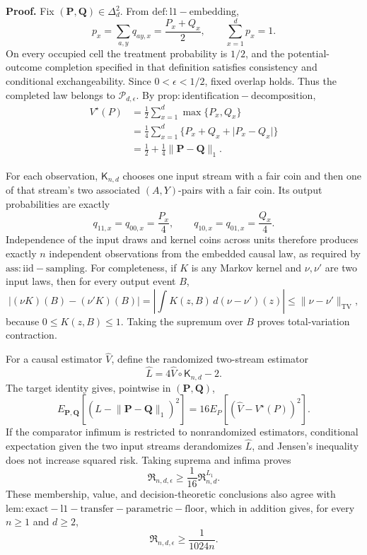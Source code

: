 \textbf{Proof.}
Fix \((\mathbf P,\mathbf Q)\in\Delta_d^2\).  From \(\mathrm{def:l1-embedding}\),
\[
 p_x=\sum_{a,y}q_{ay,x}=\frac{P_x+Q_x}{2},
 \qquad
 \sum_{x=1}^dp_x=1.
\]
On every occupied cell the treatment probability is \(1/2\), and the potential-outcome completion specified in that definition satisfies consistency and conditional exchangeability.  Since \(0<\epsilon<1/2\), fixed overlap holds.  Thus the completed law belongs to \(\mathcal P_{d,\epsilon}\).  By \(\mathrm{prop:identification-decomposition}\),
\[
 \begin{aligned}
 V^\star(P)
 &=\frac12\sum_{x=1}^d\max\{P_x,Q_x\}\\
 &=\frac14\sum_{x=1}^d
   \{P_x+Q_x+\lvert P_x-Q_x\rvert\}\\
 &=\frac12+\frac14\lVert\mathbf P-\mathbf Q\rVert_1.
 \end{aligned}
\]

For each observation, \(\mathsf K_{n,d}\) chooses one input stream with a fair coin and then one of that stream's two associated \((A,Y)\)-pairs with a fair coin.  Its output probabilities are exactly
\[
 q_{11,x}=q_{00,x}=\frac{P_x}{4},
 \qquad
 q_{10,x}=q_{01,x}=\frac{Q_x}{4}.
\]
Independence of the input draws and kernel coins across units therefore produces exactly \(n\) independent observations from the embedded causal law, as required by \(\mathrm{ass:iid-sampling}\).  For completeness, if \(K\) is any Markov kernel and \(\nu,\nu'\) are two input laws, then for every output event \(B\),
\[
 \lvert(\nu K)(B)-(\nu'K)(B)\rvert
 =\left\lvert\int K(z,B)\,d(\nu-\nu')(z)\right\rvert
 \le\lVert\nu-\nu'\rVert_{\mathrm{TV}},
\]
because \(0\le K(z,B)\le1\).  Taking the supremum over \(B\) proves total-variation contraction.

For a causal estimator \(\widehat V\), define the randomized two-stream estimator
\[
 \widehat L=4\widehat V\circ\mathsf K_{n,d}-2.
\]
The target identity gives, pointwise in \((\mathbf P,\mathbf Q)\),
\[
 E_{\mathbf P,\mathbf Q}
 \left[(\widehat L-\lVert\mathbf P-\mathbf Q\rVert_1)^2\right]
 =16E_P\left[(\widehat V-V^\star(P))^2\right].
\]
If the comparator infimum is restricted to nonrandomized estimators, conditional expectation given the two input streams derandomizes \(\widehat L\), and Jensen's inequality does not increase squared risk.  Taking suprema and infima proves
\[
 \mathfrak R_{n,d,\epsilon}\ge\frac1{16}\mathfrak R^{L_1}_{n,d}.
\]
These membership, value, and decision-theoretic conclusions also agree with \(\mathrm{lem:exact-l1-transfer-parametric-floor}\), which in addition gives, for every \(n\ge1\) and \(d\ge2\),
\[
 \mathfrak R_{n,d,\epsilon}\ge\frac1{1024n}.
\]

